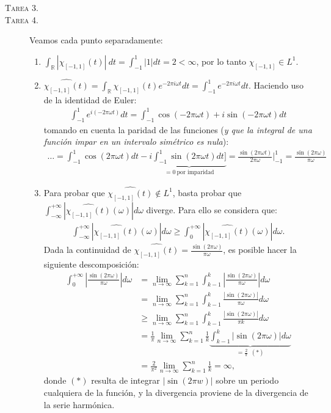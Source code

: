 \documentclass[spanish, fleqn]{article}
\begin{document}
\begin{description}
	\item[\textsc{Tarea 3.}]




	\item[\textsc{Tarea 4.}] Veamos cada punto separadamente:
	\begin{enumerate}
		\item $\displaystyle \int_{\mathbb{R}} |\chi_{[-1,1]}(t)|\ dt = \int_{-1}^{1} |1| dt = 2 < \infty$, por lo tanto $\chi_{[-1,1]} \in L^1$.
		\item $\displaystyle \widehat{\chi_{[-1,1]}(t)} = \int_{\mathbb{R}} \chi_{[-1,1]}(t) e^{-2 \pi i \omega t} dt = \int_{-1}^{1} e^{-2 \pi i \omega t} dt$. Haciendo uso de la identidad de Euler:
		\begin{align*}
			\int_{-1}^{1} e^{i (-2 \pi \omega t)} dt = \int_{-1}^{1} \cos(-2 \pi \omega t) + i \sin(-2 \pi \omega t) dt
		\end{align*}
		tomando en cuenta la paridad de las funciones (\textit{y que la integral de una función impar en un intervalo simétrico es nula}):
		\begin{align*}
			\ldots = \int_{-1}^{1} \cos(2 \pi \omega t) dt - i \underbrace{\int_{-1}^{1} \sin(2 \pi \omega t) dt]}_{= 0 \ \text{por imparidad}} = \frac{\sin(2 \pi \omega t)}{2 \pi \omega} \bigg|_{-1}^{1} = \frac{\sin(2 \pi \omega)}{\pi \omega}
		\end{align*}
		\item Para probar que $\displaystyle \widehat{\chi_{[-1,1]}(t)} \notin L^1$, basta probar que $ \displaystyle \int_{-\infty}^{+\infty} \left|\widehat{\chi_{[-1,1]}(t)}(\omega)\right| d\omega$ diverge. Para ello se considera que:
		\begin{align*}
			\int_{-\infty}^{+\infty} \left|\widehat{\chi_{[-1,1]}(t)}(\omega)\right| d\omega \geq \int_{0}^{+\infty} \left|\widehat{\chi_{[-1,1]}(t)}(\omega)\right| d\omega.
		\end{align*}
		Dada la continuidad de $\displaystyle \widehat{\chi_{[-1,1]}(t)} = \frac{\sin(2 \pi \omega)}{\pi \omega}$, es posible hacer la siguiente descomposición:
		\begin{align*}
			\int_{0}^{+\infty} \left| \frac{\sin(2 \pi \omega)}{\pi \omega} \right| d\omega &= \lim_{n\rightarrow \infty} \sum_{k=1}^{n} \int_{k-1}^{k} \left|\frac{\sin(2 \pi \omega)}{\pi \omega}\right| d\omega \\
			&= \lim_{n\rightarrow \infty} \sum_{k=1}^{n} \int_{k-1}^{k} \frac{\left| \sin(2 \pi \omega) \right|}{\pi \omega} d\omega \\
			&\geq \lim_{n\rightarrow \infty} \sum_{k=1}^{n} \int_{k-1}^{k} \frac{\left| \sin(2 \pi \omega) \right|}{\pi k} d\omega \\
			&=  \frac{1}{\pi} \lim_{n\rightarrow \infty} \sum_{k=1}^{n} \frac{1}{k} \underbrace{\int_{k-1}^{k} \left| \sin(2 \pi \omega) \right| d\omega}_{= \frac{2}{\pi} \ \ (*)} \\
			&= \frac{2}{\pi^2} \lim_{n\rightarrow \infty} \sum_{k=1}^{n} \frac{1}{k} = \infty,
		\end{align*}
		donde $(*)$ resulta de integrar $|\sin(2 \pi w)|$ sobre un periodo cualquiera de la función, y la divergencia proviene de la divergencia de la serie harmónica.



\end{enumerate}
\end{description}
\end{document}
